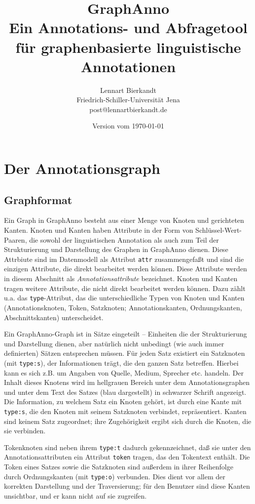 \documentclass[12pt]{scrartcl}
\title{\LARGE GraphAnno\\ \large Ein Annotations- und Abfragetool\\für graphenbasierte linguistische Annotationen}
\author{Lennart Bierkandt\\\large Friedrich-Schiller-Universität Jena\\[-.2em]\large post@lennartbierkandt.de}
\date{Version vom \today}
\begin{document}
\maketitle

\renewcommand{\baselinestretch}{1.05}\normalsize

\renewcommand{\contentsname}{Inhalt}
\tableofcontents


\section{Der Annotationsgraph}

\subsection{Graphformat}

Ein Graph in GraphAnno besteht aus einer Menge von Knoten und gerichteten Kanten. Knoten und Kanten haben Attribute in der Form von Schlüssel-Wert-Paaren, die sowohl der linguistischen Annotation als auch zum Teil der Strukturierung und Darstellung des Graphen in GraphAnno dienen. Diese Attrbiute sind im Datenmodell als Attribut \texttt{attr} zusammengefaßt und sind die einzigen Attribute, die direkt bearbeitet werden können. Diese Attribute werden in diesem Abschnitt als \textit{Annotationsattribute} bezeichnet. Knoten und Kanten tragen weitere Attribute, die nicht direkt bearbeitet werden können. Dazu zählt u.a. das \texttt{type}-Attribut, das die unterschiedliche Typen von Knoten und Kanten (Annotationsknoten, Token, Satzknoten; Annotationskanten, Ordnungskanten, Abschnittskanten) unterscheidet.

Ein GraphAnno-Graph ist in Sätze eingeteilt – Einheiten die der Strukturierung und Darstellung dienen, aber natürlich nicht unbedingt (wie auch immer definierten) Sätzen entsprechen müssen.
Für jeden Satz existiert ein Satzknoten (mit \texttt{type:s}), der Informationen trägt, die den ganzen Satz betreffen. Hierbei kann es sich z.B. um Angaben von Quelle, Medium, Sprecher etc. handeln. Der Inhalt dieses Knotens wird im hellgrauen Bereich unter dem Annotationsgraphen und unter dem Text des Satzes (blau dargestellt) in schwarzer Schrift angezeigt.
Die Information, zu welchem Satz ein Knoten gehört, ist durch eine Kante mit \texttt{type:s}, die den Knoten mit seinem Satzknoten verbindet, repräsentiert. Kanten sind keinem Satz zugeordnet; ihre Zugehörigkeit ergibt sich durch die Knoten, die sie verbinden.

Tokenknoten sind neben ihrem \texttt{type:t} dadurch gekennzeichnet, daß sie unter den Annotationsattributen ein Attribut \texttt{token} tragen, das den Tokentext enthält. Die Token eines Satzes sowie die Satzknoten sind außerdem in ihrer Reihenfolge durch Ordnungskanten (mit \texttt{type:o}) verbunden. Dies dient vor allem der korrekten Darstellung und der Traversierung; für den Benutzer sind diese Kanten unsichtbar, und er kann nicht auf sie zugreifen.
\end{document}
